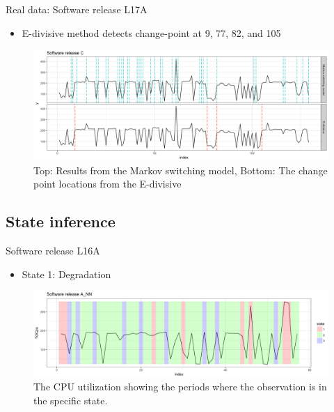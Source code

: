 \documentclass{beamer}
\begin{document}
\begin{frame}
Real data: Software release L17A

\begin{itemize}
	\item E-divisive method detects change-point at 9, 77, 82, and 105
\end{itemize}

\begin{figure}
	\includegraphics[width=1\linewidth]{compare_L17A}
	\caption{Top: Results from the Markov switching model, Bottom: The change point locations from the E-divisive}
\end{figure}
\end{frame}

\subsection{State inference}
\begin{frame}
Software release L16A
\pause

\begin{itemize}
	\item State 1: Degradation
\end{itemize}

\begin{figure}
	\includegraphics[width=1\linewidth]{L16A_NN1}
	\caption{The CPU utilization showing the periods where the observation is in the specific state.}
\end{figure}

\end{frame}
\end{document}
